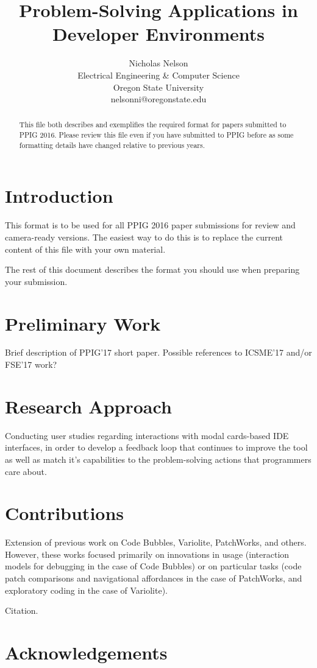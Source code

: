 \documentclass{ppig}
\title{Problem-Solving Applications in Developer Environments}
\author{Nicholas Nelson \\
  Electrical Engineering \& Computer Science \\
  Oregon State University \\
  nelsonni@oregonstate.edu}
\date{}
\begin{document}
\maketitle
\thispagestyle{empty}

\begin{abstract}
This file both describes and exemplifies the required format for papers submitted to PPIG 2016. Please review this file even if you have submitted to PPIG before as some formatting details have changed relative to previous years.
\end{abstract}

\section{Introduction}

This format is to be used for all PPIG 2016 paper submissions for review and camera-ready versions. The easiest way to do this is to replace the current content of this file with your own material.

The rest of this document describes the format you should use when preparing your submission.

\section{Preliminary Work}
Brief description of PPIG'17 short paper. Possible references to ICSME'17 and/or FSE'17 work?

\section{Research Approach}
Conducting user studies regarding interactions with modal cards-based IDE interfaces, in order to develop a feedback loop that continues to improve the tool as well as match it's capabilities to the problem-solving actions that programmers care about.

\section{Contributions}
Extension of previous work on Code Bubbles, Variolite, PatchWorks, and others. However, these works focused primarily on innovations in usage (interaction models for debugging in the case of Code Bubbles) or on particular tasks (code patch comparisons and navigational affordances in the case of PatchWorks, and exploratory coding in the case of Variolite).

Citation\cite{blackwell1999how}.

\section{Acknowledgements}


 
\end{document}
